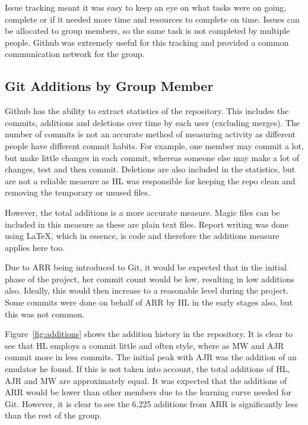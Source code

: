 Issue tracking meant it was easy to keep an eye on what tasks were on going, complete or if it needed more time and resources to complete on time.
Issues can be allocated to group members, so the same task is not completed by multiple people. 
Github was extremely useful for this tracking and provided a common communication network for the group. 

\subsection{Git Additions by Group Member}

Github has the ability to extract statistics of the repository. 
This includes the commits, additions and deletions over time by each user (excluding merges). 
The number of commits is not an accurate method of measuring activity as different people have different commit habits.
For example, one member may commit a lot, but make little changes in each commit, whereas someone else may make a lot of changes, test and then commit.
Deletions are also included in the statistics, but are not a reliable measure as HL was responsible for keeping the repo clean and removing the temporary or unused files. 

However, the total additions is a more accurate measure. 
Magic files can be included in this measure as these are plain text files.
Report writing was done using \LaTeX, which in essence, is code and therefore the additions measure applies here too.

Due to ARR being introduced to Git, it would be expected that in the initial phase of the project, her commit count would be low, resulting in low additions also. 
Ideally, this would then increase to a reasonable level during the project. 
Some commits were done on behalf of ARR by HL in the early stages also, but this was not common.

Figure~\ref{fig:additions} shows the addition history in the repository. 
It is clear to see that HL employs a commit little and often style, where as MW and AJR commit more in less commits. 
The initial peak with AJR was the addition of an emulator he found.
If this is not taken into account, the total additions of HL, AJR and MW are approximately equal.  
It was expected that the additions of ARR would be lower than other members due to the learning curve needed for Git.
However, it is clear to see the 6,225 additions from ARR is significantly less than the rest of the group.

